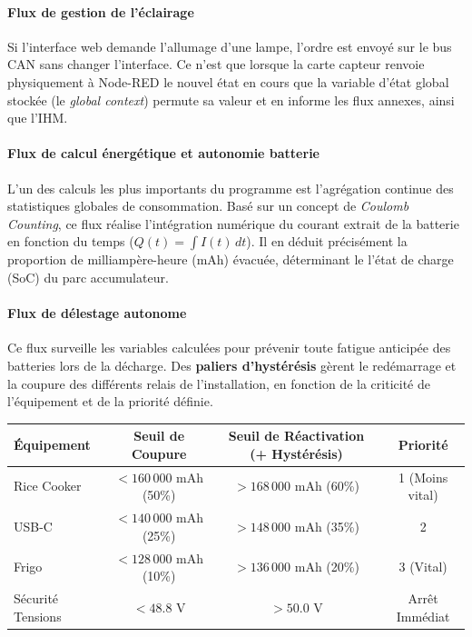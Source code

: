     \paragraph{Flux de gestion de l'éclairage}
    Si l'interface web demande l'allumage d'une lampe, l'ordre est envoyé sur le bus CAN sans changer l'interface. Ce n'est que lorsque la carte capteur renvoie physiquement à Node-RED le nouvel état en cours que la variable d'état global stockée (le \textit{global context}) permute sa valeur et en informe les flux annexes, ainsi que l'IHM.

    \paragraph{Flux de calcul énergétique et autonomie batterie}
    L'un des calculs les plus importants du programme est l'agrégation continue des statistiques globales de consommation. Basé sur un concept de \textit{Coulomb Counting}, ce flux réalise l'intégration numérique du courant extrait de la batterie en fonction du temps (\(Q(t) = \int I(t) \, dt\)). Il en déduit précisément la proportion de milliampère-heure (mAh) évacuée, déterminant le l'état de charge (SoC) du parc accumulateur.

    \paragraph{Flux de délestage autonome}
    Ce flux surveille les variables calculées pour prévenir toute fatigue anticipée des batteries lors de la décharge. Des \textbf{paliers d'hystérésis} gèrent le redémarrage et la coupure des différents relais de l'installation, en fonction de la criticité de l'équipement et de la priorité définie.

    \begin{tableau}[H]
        \footnotesize
        \centering
        \begin{tabular}{|l|c|c|c|}
            \hline
            \textbf{Équipement} & \textbf{Seuil de Coupure} & \textbf{Seuil de Réactivation (+ Hystérésis)} & \textbf{Priorité} \\
            \hline
            \hline
            Rice Cooker & $< 160\,000$ mAh (50\%) & $> 168\,000$ mAh (60\%) & 1 (Moins vital) \\
            \hline
            USB-C & $< 140\,000$ mAh (25\%) & $> 148\,000$ mAh (35\%) & 2 \\
            \hline
            Frigo & $< 128\,000$ mAh (10\%) & $> 136\,000$ mAh (20\%) & 3 (Vital) \\
            \hline
            Sécurité Tensions & $< 48.8$ V & $> 50.0$ V & Arrêt Immédiat \\
            \hline
        \end{tabular}
        \caption{Paliers et priorités de délestage autonome programmés dans le flux de supervision.}
        \label{tab:delestage}
    \end{tableau}

